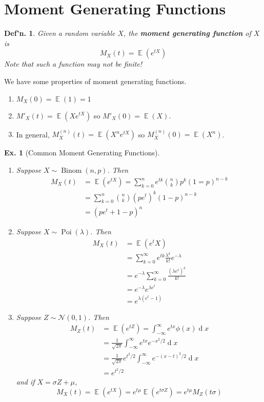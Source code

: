 \documentclass[12pt, a4paper]{book}
\DeclareMathOperator{\E}{\mathbb{E}}
\DeclareMathOperator{\Poi}{Poi}
\renewcommand{\d}[1]{\ensuremath{\operatorname{d}\!{#1}}} %
\newtheorem{definition}[theorem]{Def'n.}
\newtheorem{example}[theorem]{Ex.}
\theoremstyle{nonumberplain}
\begin{document}
\section{Moment Generating Functions}
\begin{definition}
    Given a random variable $X$, the \textbf{moment generating function} of $X$ is
    \[M_X(t)=\E(e^{tX})\]
    Note that such a function may not be finite!
\end{definition}
We have some properties of moment generating functions.
\begin{enumerate}[nolistsep]
    \item $M_X(0)=\E(1)=1$
    \item $M'_X(t)=\E(Xe^{tX})$ so $M'_X(0)=\E(X)$.
    \item In general, $M^{(n)}_X(t)=\E(X^ne^{tX})$ so $M^{(n)}_X(0)=\E(X^n)$.
\end{enumerate}
\begin{example}[Common Moment Generating Functions]
    \begin{enumerate}
        \item Suppose $X\sim\operatorname{Binom}(n,p)$.
            Then
            \begin{align*}
                M_X(t) &= \E(e^{tX})=\sum\limits_{k=0}^ne^{tk}\binom{n}{k}p^k(1=p)^{n-k}\\
                       &= \sum\limits_{k=0}^n \binom{n}{k}(pe^t)^k(1-p)^{n-k}\\
                       &= (pe^t+1-p)^n
            \end{align*}
        \item Suppose $X\sim\Poi(\lambda)$.
            Then
            \begin{align*}
                M_X(t) &= \E(e^tX)\\
                       &= \sum\limits_{k=0}^\infty e^{tk}\frac{\lambda^k}{k!}e^{-\lambda}\\
                       &= e^{-\lambda}\sum\limits_{k=0}^\infty\frac{(\lambda e^t)^k}{k!}\\
                       &= e^{-\lambda}{e^{\lambda e^t}}\\
                       &= e^{\lambda(e^t-1)}
            \end{align*}
        \item Suppose $Z\sim\mathcal{N}(0,1)$.
            Then
            \begin{align*}
                M_Z(t) &= \E(e^{tZ})=\int_{-\infty}^\infty e^{tx}\phi(x)\d{x}\\
                       &= \frac{1}{\sqrt{2\pi}}\int_{-\infty}^\infty e^{tx}e^{-x^2/2}\d{x}\\
                       &= \frac{1}{\sqrt{2\pi}}e^{t^2/2}\int_{-\infty}^\infty e^{-(x-t)^2/2}\d{x}\\
                       &= e^{t^2/2}
            \end{align*}
            and if $X=\sigma Z+\mu$,
            \begin{equation*}
                M_X(t) = \E(e^{tX})=e^{t\mu}\E(e^{t\sigma Z})=e^{t\mu}M_Z(t\sigma)
            \end{equation*}
    \end{enumerate}
\end{example}
\end{document}
